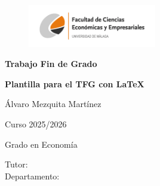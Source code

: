 \documentclass[13pt,a4paper]{report}
\begin{document}
\begin{titlepage}
    \centering 
    \begin{figure}[h!]
        \centering
        \includegraphics[width=0.5\textwidth]{logo.png}
    \end{figure}
    
    \vspace*{1cm} 
    \Huge
    \textbf{Trabajo Fin de Grado}
    \vspace*{1cm}
    
    \Huge
    
    \textbf{Plantilla para el TFG con \LaTeX}
    
    \vspace{0.5cm}
    \LARGE 
    
    Álvaro Mezquita Martínez
    
    \vspace{0.5cm} 

    Curso 2025/2026
        
    \vspace{0.5cm}

    Grado en Economía
    
    \vfill

    \raggedleft     
    Tutor:  \makebox[5cm]{\dotfill} %
    \\
    Departamento:  \makebox[5cm]{\dotfill} %
    
    \vspace{5cm}
\end{titlepage}


\newpage

\fancyhf{} %
\thispagestyle{fancy} %
\end{document}
